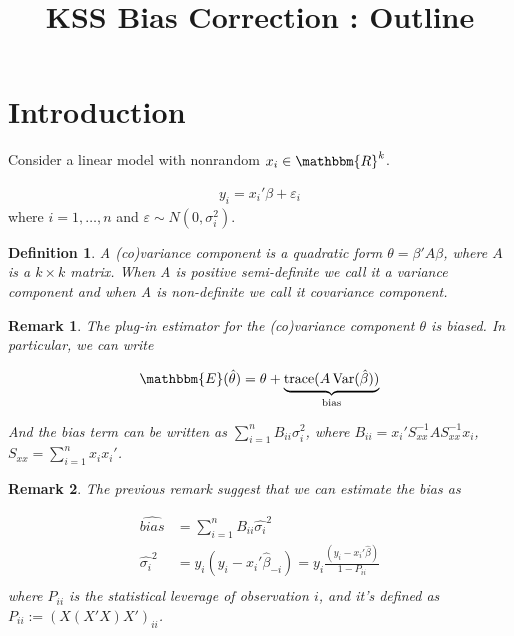 \documentclass[12pt]{article}
\title{{\Large \vspace{-5em} \textbf{KSS Bias Correction : Outline} }}
\author{}
\date{}
\newtheorem{remark}{Remark}
\newtheorem{definition}[theorem]{Definition}
\DeclareMathOperator{\trace}{trace}
\DeclareMathOperator{\Var}{Var}
\begin{document}
\maketitle

\section{Introduction}
Consider a linear model with nonrandom $x_i \in \mathbbm{R}^k$. 

\begin{align*}
    y_i = x_i' \beta + \varepsilon_i
\end{align*}
where $i = 1,\dots,n$ and $\varepsilon \sim N(0, \sigma_i^2)$.

\begin{definition}
A (co)variance component is a quadratic form $\theta = \beta' A \beta $, where $A$ is a $k\times k$ matrix. When A is positive semi-definite we call it a variance component and when A is non-definite we call it covariance component.
\end{definition}

\begin{remark}
The plug-in estimator for the (co)variance component $\theta$ is biased. In particular, we can write 

\begin{align*}
    \mathbbm{E}(\hat{\theta}) = \theta + \underbrace{ \trace(A \Var(\hat{\beta}))}_\text{bias}
\end{align*}

\noindent And the bias term can be written as $\sum_{i=1}^n B_{ii} \sigma_i^2$, where $B_{ii} = x_i' S_{xx}^{-1} A S_{xx}^{-1} x_i  $, $S_{xx} = \sum_{i=1}^n x_i x_i'$.
\end{remark}

\begin{remark}
The previous remark suggest that we can estimate the bias as

\begin{align*}
    \hat{bias} &= \sum_{i=1}^n B_{ii} \hat{\sigma_i}^2 \\    
    \hat{\sigma_i}^2 &= y_i (y_i - x_i' \hat{\beta}_{-i}) = y_i \frac{(y_i - x_i ' \hat{\beta})}{1-P_{ii}}\\
\end{align*}
where $P_{ii}$ is the statistical leverage of observation $i$, and it's defined as $P_{ii} := (X (X'X) X')_{ii}$.

\end{remark}
\end{document}
